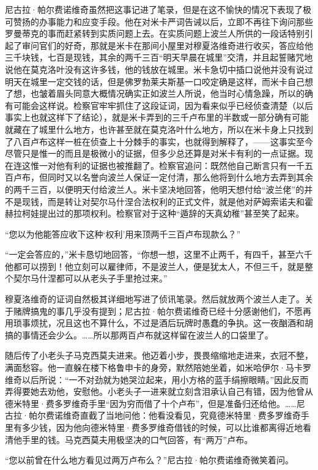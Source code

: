 \par 尼古拉·帕尔费诺维奇虽然把这事记进了笔录，但是在这不愉快的情况下表现了极可赞扬的办事能力和应变手段。他在对米卡严词告诫以后，立即不再往下询问那些罗曼蒂克的事而赶紧转到实质问题上去。在实质问题上波兰人所供的一段话特别引起了审问官们的好奇，那就是米卡在那间小屋里对穆夏洛维奇进行收买，答应给他三千块钱，七百是现钱，其余的两千三百“明天早晨在城里”交清，并且起誓赌咒地说他在莫克洛叶没有这许多钱，他的钱放在城里。米卡急切中插口说他并没有说过明天在城里一定交钱的话，但是佛罗勃莱夫斯基一口咬定确是这样，而米卡自己想了想，也皱着眉头同意大概情况确实正如波兰人所说，他当时心情急躁，所以的确有可能会这样说。检察官牢牢抓住了这段证词，因为看来似乎已经侦查清楚（以后事实上也就这样下了结论），就是米卡弄到的三千卢布里的半数或一部分确有可能就藏在了城里什么地方，也许甚至就在莫克洛叶什么地方，所以在米卡身上只找到了八百卢布这样一桩在侦查上十分棘手的事实，也就得到解释了，——这事实至今尽管只是惟一的而且是极微小的证据，但多少总还算是对米卡有利的一点证据。现在连这惟一对他有利的证据也被推翻了。检察官追问：既然他自己断言只有一千五百卢布，但同时又以名誉向波兰人保证一定付清，那么他将到什么地方去弄到其余的两千三百，以便明天付给波兰人。米卡坚决地回答，他明天想付给“波兰佬”的并不是现钱，而是转让对契尔马什涅合法权利的正式文件，就是他对萨姆索诺夫和霍赫拉柯娃提出过的那项权利。检察官对于这种“遁辞的天真幼稚”甚至笑了起来。
\par “您以为他能答应收下这种‘权利’用来顶两千三百卢布现款么？”
\par “一定会答应的，”米卡恳切地回答，“你想一想，这里不止两千，有四千，甚至六千他都可以捞到！他立刻可以雇律师，不是波兰人，便是犹太人，不但三千，就是整个契尔马什涅都可以从老头子手里抢过来。”
\par 穆夏洛维奇的证词自然极其详细地写进了侦讯笔录。然后就放两个波兰人走了。关于赌牌搞鬼的事几乎没有提到；尼古拉·帕尔费诺维奇已经十分感谢他们，不愿再用琐事烦扰，况且这也不算什么，不过是酒后玩牌时愚蠢的争执。这一夜酗酒和胡搞的事情还会少么。……所以那两百卢布就这样留在波兰人的口袋里了。
\par 随后传了小老头子马克西莫夫进来。他迈着小步，畏畏缩缩地走进来，衣冠不整，满面愁容。他一直躲在楼下格鲁申卡的身旁，默然陪她坐着，如米哈伊尔·马卡罗维奇以后所说：“一不对劲就为她哭泣起来，用小方格的蓝手绢擦眼睛。”因此反而弄得要她去劝他，安慰他。小老头子一进来就立刻含泪承认自己有错，因为他曾从德米特里·费多罗维奇手里“因为穷而借了十个卢布”，但是准备归还给他。……尼古拉·帕尔费诺维奇直截了当地问他：他看没看见，究竟德米特里·费多罗维奇手里有多少钱，因为他向德米特里·费多罗维奇借钱的时候，可以比谁都离得近地看清他手里的钱。马克西莫夫用极坚决的口气回答，有“两万”卢布。
\par “您以前曾在什么地方看见过两万卢布么？”尼古拉·帕尔费诺维奇微笑着问。
